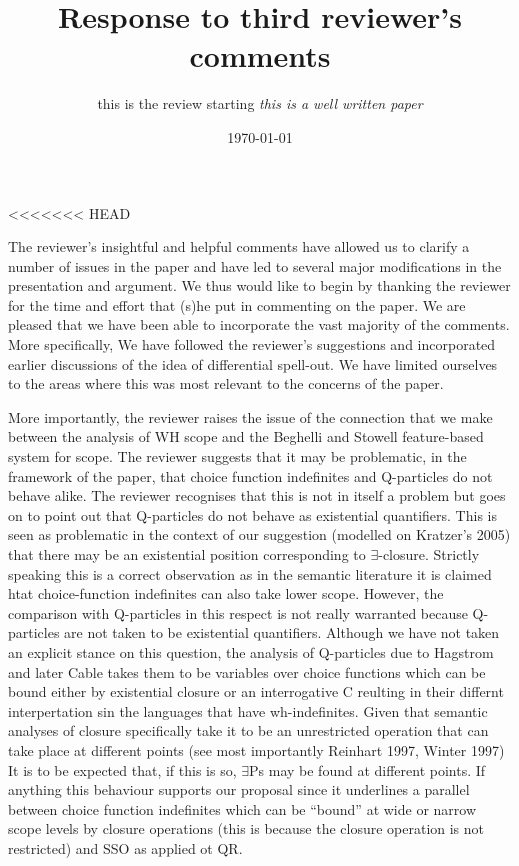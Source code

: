\documentclass[11pt]{article}
\begin{document}
<<<<<<< HEAD
\title{Response to third reviewer's comments}
\author{this is the review starting \textit{this is a well written paper}}
\date{\today}

\maketitle


The reviewer's insightful and helpful comments have allowed us to clarify a number of issues in the paper and have led to several major modifications in the presentation and argument. We thus would like to begin by thanking the reviewer for the time and effort that (s)he put in commenting on the paper. We are pleased that we have been able to incorporate the vast majority of the comments.  More specifically, We have followed the reviewer's suggestions and incorporated earlier discussions of the idea of differential spell-out.  We have limited ourselves to the areas where this was most relevant to the concerns of the paper.

More importantly, the reviewer raises the issue of the connection that we make between the analysis of WH scope and the Beghelli and Stowell feature-based system for scope.  The reviewer suggests that it may be problematic, in the framework of the paper, that choice function  indefinites and Q-particles do not behave alike.  The reviewer recognises that this is not in itself a problem but goes on to point out that  Q-particles do not behave as existential quantifiers.  This is seen as problematic in the context of our suggestion (modelled on Kratzer's 2005) that there may be an existential position corresponding to $\exists$-closure.    Strictly speaking this is a correct observation as in the semantic literature it is claimed htat choice-function indefinites can also take lower scope.  However, the comparison with Q-particles in this respect is not really warranted because Q-particles are not taken to be existential quantifiers.  Although we have not taken an explicit stance on this question, the analysis of Q-particles due to Hagstrom and later Cable takes them to be variables over choice functions which can be bound either by existential closure or an interrogative C reulting in their differnt interpertation sin the languages that have wh-indefinites. Given that semantic analyses of closure specifically take it to be an unrestricted operation that can take place at different points (see most importantly Reinhart 1997, Winter 1997)  It is to be expected that, if this is so, $\exists$Ps may be found at different points.   If anything this behaviour supports our proposal since it underlines a parallel between choice function indefinites which can be ``bound'' at wide or narrow scope levels by closure operations (this is because the closure operation is not restricted) and SSO as applied ot QR.
\end{document}
